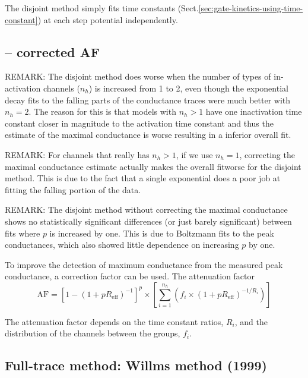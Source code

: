 The disjoint method simply fits time constants
(Sect.\ref{sec:gate-kinetics-using-time-constant}) at each step potential
independently.


\subsection{-- corrected AF}

REMARK: The disjoint method does worse  when the number of types of
in-activation channels ($n_h$) is increased from 1 to 2, even though the
exponential decay fits to the falling parts of the conductance traces were much
better with $n_h=2$. The reason for this is that models with $n_h >1$ have one
inactivation time constant closer in magnitude to the activation time constant
and thus the estimate of the maximal conductance is worse resulting in a
inferior overall fit.

REMARK: For channels that really has $n_h> 1$, if we use $n_h=1$, correcting the
maximal conductance estimate actually makes the overall fitworse for the
disjoint method. This is due to the fact that a single exponential
does a poor job at fitting the falling portion of the data.

REMARK: The disjoint method without correcting the maximal conductance shows no
statistically significant differences (or just barely significant) between fits
where $p$ is increased by one. This is due to Boltzmann fits to the peak
conductances, which also showed little dependence on increasing $p$ by one.

To improve the detection of maximum conductance from the measured peak
conductance, a correction factor can be used. The attenuation factor
\begin{equation}
\text{AF} = \left[ 1 - (1+ p R_\text{eff})^{-1} \right]^p
 \times \left[ \sum_{i=1}^{n_h} (f_i \times (1 + p R_\text{eff})^{-1/R_i}) \right]
\end{equation}

The attenuation factor depends on the time constant ratios, $R_i$, and the
distribution of the channels between the groups, $f_i$.


\subsection{Full-trace method: Willms method (1999)}
\label{sec:Willms-method}

